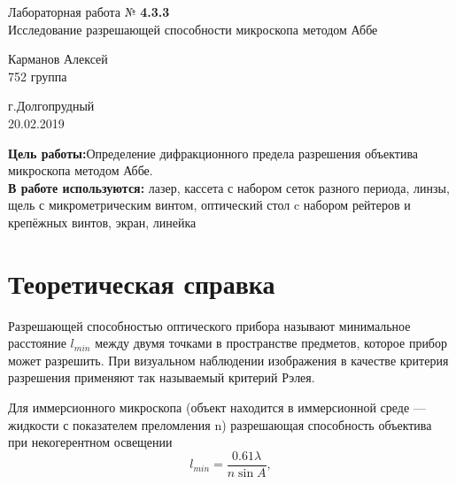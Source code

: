 \documentclass[12pt]{article}
\begin{document}
\begin{titlepage}
\begin{center}
\huge{Лабораторная работа № \textbf{4.3.3}}\\[1cm]\LARGE {Исследование разрешающей способности микроскопа методом Аббе\\[7 cm]}
\end{center}

\begin{flushright}
\Large{Карманов Алексей\\752 группа}\\[9 cm]
\end{flushright}
\begin{center}
г.Долгопрудный\\
20.02.2019
\end{center}
\end{titlepage}
\fancyhead[L]
\indent \textbf{Цель работы:}Определение дифракционного предела разрешения
объектива микроскопа методом Аббе.\\[0.75 cm]
\indent \textbf{В работе используются:} лазер, кассета с набором сеток разного периода, линзы, щель с микрометрическим винтом, оптический стол c набором рейтеров и крепёжных винтов, экран, линейка\\
\section{Теоретическая справка}
Разрешающей способностью оптического прибора называют минимальное расстояние $l_{min}$ между двумя точками в пространстве предметов, которое прибор может разрешить. При визуальном наблюдении изображения в качестве критерия разрешения применяют так называемый критерий Рэлея. \par
Для иммерсионного микроскопа (объект находится в иммерсионной среде — жидкости с показателем преломления n) разрешающая способность объектива при некогерентном освещении
\begin{equation}
    l_{min} = \frac{0.61 \lambda}{n \sin A},
\end{equation}
\end{document}
